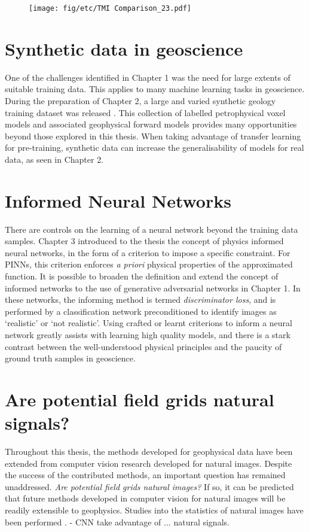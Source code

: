 \documentclass[manuscript.tex]{subfiles}
\begin{document}
\begin{figure}[hbt]
    \texttt{[image: fig/etc/TMI Comparison\_23.pdf]} %
    \caption{}
    \label{fig:rdncomp}
\end{figure}

\section{Synthetic data in geoscience}
One of the challenges identified in Chapter 1 was the need for large extents of suitable training data.
This applies to many machine learning tasks in geoscience.
During the preparation of Chapter 2, a large and varied synthetic geology training dataset was released \parencite{jessellNoddyverseMassiveData2022}.
This collection of labelled petrophysical voxel models and associated geophysical forward models provides many opportunities beyond those explored in this thesis.
When taking advantage of transfer learning for pre-training, synthetic data can increase the generalisability of models for real data, as seen in Chapter 2.


\section{Informed Neural Networks}
There are controls on the learning of a neural network beyond the training data samples.
Chapter 3 introduced to the thesis the concept of physics informed neural networks, in the form of a criterion to impose a specific constraint.
For PINNs, this criterion enforces \emph{a priori} physical properties of the approximated function.
It is possible to broaden the definition and extend the concept of informed networks to the use of generative adversarial networks in Chapter 1.
In these networks, the informing method is termed \emph{discriminator loss}, and is performed by a classification network preconditioned to identify images as `realistic' or `not realistic'.
Using crafted or learnt criterions to inform a neural network greatly assists with learning high quality models, and there is a stark contrast between the well-understood physical principles and the paucity of ground truth samples in geoscience.

\section{Are potential field grids natural signals?}
Throughout this thesis, the methods developed for geophysical data have been extended from computer vision research developed for natural images.
Despite the success of the contributed methods, an important question has remained unaddressed.
\emph{Are potential field grids natural images?}
If so, it can be predicted that future methods developed in computer vision for natural images will be readily extensible to geophysics.
Studies into the statistics of natural images have been performed \parencite{simoncelliNaturalImageStatistics2001,rudermanStatisticsNaturalImages1994,tolhurstAmplitudeSpectraNatural1992}.
\Textcite{lecunDeepLearning2015} - CNN take advantage of ... natural signals. 
\end{document}
